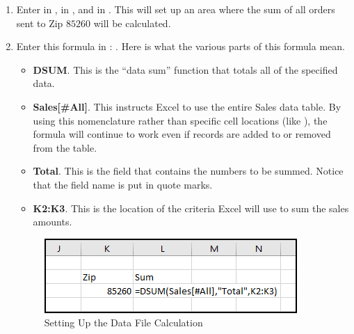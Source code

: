 \begin{enumerate}[resume]
	\item Enter  in ,  in , and  in . This will set up an area where the sum of all orders sent to Zip $ 85260 $ will be calculated.
	\item Enter this formula in : . Here is what the various parts of this formula mean.

	\begin{itemize}
		\item \textbf{DSUM}. This is the ``data sum'' function that totals all of the specified data.
		\item \textbf{Sales[\#All]}. This instructs Excel to use the entire Sales data table. By using this nomenclature rather than specific cell locations (like ), the formula will continue to work even if records are added to or removed from the table.
		\item \textbf{Total}. This is the field that contains the numbers to be summed. Notice that the field name is put in quote marks.
		\item \textbf{K2:K3}. This is the location of the criteria Excel will use to sum the sales amounts.
	\end{itemize}	

	\begin{figure}[H]
		\centering
		\includegraphics[width=\maxwidth{.95\linewidth}]{gfx/ch09_fig21}
		\caption{Setting Up the Data File Calculation}
		\label{09:fig21}
	\end{figure}


\end{enumerate}
